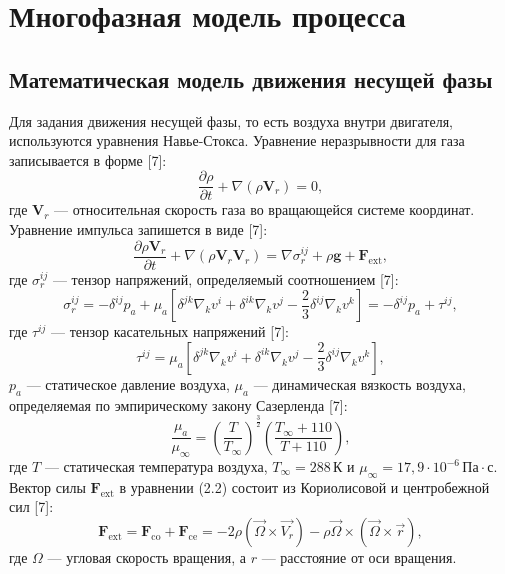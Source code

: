 \chapter{Многофазная модель процесса}

\section{Математическая модель движения несущей фазы}

Для задания движения несущей фазы, то есть воздуха внутри двигателя, используются уравнения Навье-Стокса. Уравнение неразрывности для газа записывается в форме [7]: 
\begin{equation}
	\frac{\partial \rho}{\partial t}+\nabla(\rho \mathbf{V}_r)=0,
\end{equation}
где $\mathbf{V}_r$ --- относительная скорость газа во вращающейся системе координат. Уравнение импульса запишется в виде [7]:
\begin{equation}
	\frac{\partial \rho \mathbf{V}_r}{\partial t}+\nabla(\rho \mathbf{V}_r \mathbf{V}_r)= \nabla \sigma^{ij}_r+\rho \mathbf{g}+\mathbf{F}_\text{ext},
\end{equation}
где $\sigma^{ij}_r$ --- тензор напряжений, определяемый соотношением [7]:
\begin{equation}
	\sigma^{ij}_r=-\delta^{ij} p_a+\mu_a\left[\delta^{jk} \nabla_k v^i+\delta^{ik} \nabla_k v^j-\frac{2}{3}\delta^{ij} \nabla_k v^k\right] = -\delta^{ij} p_a+\tau^{ij},
\end{equation}
где $\tau^{ij}$ --- тензор касательных напряжений [7]:
\begin{equation}
	\tau^{ij}=\mu_a\left[\delta^{jk} \nabla_k v^i+\delta^{ik} \nabla_k v^j-\frac{2}{3}\delta^{ij} \nabla_k v^k\right],
\end{equation}
$p_a$ --- статическое давление воздуха, $\mu_a$ --- динамическая вязкость воздуха, определяемая по эмпирическому закону Сазерленда [7]:
\begin{equation}
	\frac{\mu_a}{\mu_\infty}=\left(\frac{T}{T_\infty}\right)^{\frac{3}{2}}\left(\frac{T_\infty+110}{T+110}\right),
\end{equation}
где $T$ --- статическая температура воздуха, $T_\infty = 288\,\text{К}$ и $\mu_\infty = 17{,}9 \cdot 10^{-6}\,\text{Па} \cdot \text{с}$. Вектор силы $\mathbf{F}_\text{ext}$ в уравнении (2.2) состоит из Кориолисовой и центробежной сил [7]:
\begin{equation}
	\mathbf{F}_\text{ext} = \mathbf{F}_\text{co}+\mathbf{F}_\text{ce}=-2 \rho(\vec{\Omega} \times \vec{V_r})-\rho \vec{\Omega} \times (\vec{\Omega} \times \vec{r}),
\end{equation}
где $\Omega$ --- угловая скорость вращения, а $r$ --- расстояние от оси вращения. 

